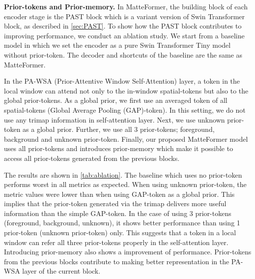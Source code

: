 \documentclass[10pt,twocolumn,letterpaper]{article}
\begin{document}
\textbf{{Prior-tokens and Prior-memory}. }
In MatteFormer, the building block of each encoder stage is the PAST block which is a variant version of Swin Transformer block, as described in \cref{sec:PAST}. To show how the PAST block contributes to improving performance, we conduct an ablation study. We start from a baseline model in which we set the encoder as a pure Swin Transformer Tiny model without prior-token. The decoder and shortcuts of the baseline are the same as MatteFormer.

In the PA-WSA (Prior-Attentive Window Self-Attention) layer, a token in the local window can attend not only to the in-window spatial-tokens but also to the global prior-tokens. 
As a global prior, we first use an averaged token of all spatial-tokens (Global Average Pooling (GAP)-token). In this setting, we do not use any trimap information in self-attention layer.
Next, we use unknown prior-token as a global prior. 
Further, we use all 3 prior-tokens; foreground, background and unknown prior-token.
Finally, our proposed MatteFormer model uses all prior-tokens and introduces prior-memory which make it possible to access all prior-tokens generated from the previous blocks.

The results are shown in \cref{tab:ablation}.
The baseline which uses no prior-token performs worst in all metrics as expected.
When using unknown prior-token, the metric values were lower than when using GAP-token as a global prior. This implies that the prior-token generated via the trimap delivers more useful information than the simple GAP-token.
In the case of using 3 prior-tokens (foreground, background, unknown), it shows better performance than using 1 prior-token (unknown prior-token) only. 
This suggests that a token in a local window can refer all three prior-tokens properly in the self-attention layer. Introducing prior-memory also shows a improvement of performance.
Prior-tokens from the previous blocks contribute to making better representation in the PA-WSA layer of the current block.
\end{document}
